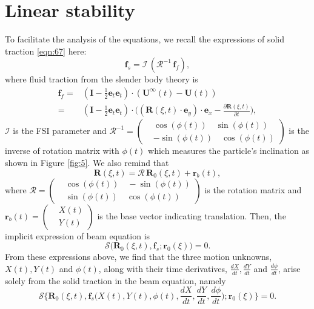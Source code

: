\documentclass[a4paper,12pt]{report}
\begin{document}
\section{Linear stability}
To facilitate the analysis of the equations, we recall the expressions of solid traction \eqref{eqn:67} here:
\begin{equation}
	\label{eqn:104}
		\textbf{f}_s=\mathcal{I}\,\left(\bm{\mathcal{R}}^{-1}\,\textbf{f}_f\right),
\end{equation}
where fluid traction from the slender body theory is 
\begin{equation}
	\label{eqn:105}
	\begin{aligned}
		\textbf{f}_f=&\left(\mathbf{I}-\frac{1}{2}\mathbf{e}_t\mathbf{e}_t\right)\cdot(\mathbf{U}^{\infty}(t)-\mathbf{U}(t))\\
		=&\left(\mathbf{I}-\frac{1}{2}\mathbf{e}_t\mathbf{e}_t\right)\cdot\Big((\bm{\bm{R}}(\xi,t)\cdot\textbf{e}_y)\cdot\textbf{e}_x-\frac{\partial\textbf{R}(\xi,t)}{\partial t}\Big),
	\end{aligned}
\end{equation}
$\mathcal{I}$ is the FSI parameter and  $\bm{\mathcal{R}}^{-1}=\left(\begin{aligned}
	&\cos(\phi(t))\quad \sin(\phi(t)) \\
	&-\sin(\phi(t))\quad \cos(\phi(t))
\end{aligned}\right)$ is the inverse of rotation matrix with $\phi(t)$ which measures the particle's inclination as shown in Figure \ref{fig:5}. We also remind that 
\begin{equation}
	\textbf{R}(\xi,t)=\bm{\mathcal{R}}\,\textbf{R}_0(\xi,t)+\textbf{r}_b(t),
\end{equation}
where $\bm{\mathcal{R}}=\left(\begin{aligned}
	&\cos(\phi(t))\quad -\sin(\phi(t)) \\
	&\sin(\phi(t))\quad \cos(\phi(t))
\end{aligned}\right)$ is the rotation matrix and $\bm{r}_b(t)=\left(\begin{aligned}
&X(t) \\
&Y(t)
\end{aligned}\right)$ is the base vector indicating translation.
Then, the implicit expression of beam equation is 
\begin{equation}
	\label{eqn:106}
	\bm{\mathcal{S}}\Big(\textbf{R}_0(\xi,t),\textbf{f}_s;\textbf{r}_0(\xi)\Big)=0.
\end{equation}
From these expressions above, we find that the three motion unknowns, $X(t), Y(t)$ and $\phi(t)$, along with their time derivatives,  $\frac{dX}{dt}, \frac{dY}{dt}$ and $\frac{d\phi}{dt}$, arise solely from the solid traction in the beam equation, namely 	
\begin{equation}
	\label{eqn:107}
\bm{\mathcal{S}}\Big\{\textbf{R}_0(\xi,t),\textbf{f}_s\Big(X(t), Y(t),\phi(t),\frac{dX}{dt}, \frac{dY}{dt},\frac{d\phi}{dt}\Big);\textbf{r}_0(\xi)\Big\}=0.
\end{equation}
\end{document}

